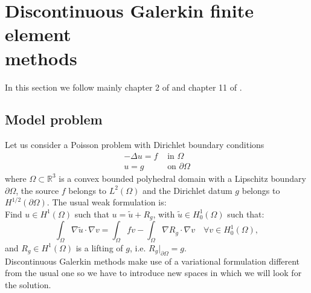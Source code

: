 \documentclass[12pt, a4paper]{article}
\theoremstyle{definition}
\theoremstyle{plain}
\theoremstyle{plain}
\theoremstyle{definition}
\begin{document}
\newpage
{}
\begin{spacing}{0.97}
\tableofcontents
\end{spacing}
\newpage


\section[Discontinuous Galerkin finite element methods]{Discontinuous Galerkin 
finite element\\methods}\label{sec:DG}
In this section we follow mainly chapter 2 of \cite{riviere} and chapter 11 of \cite{quart}.
\subsection{Model problem}
Let us consider a Poisson problem with Dirichlet boundary conditions
\begin{align} \label{eq:poisson}
	-\Delta u = f & \mbox{ in } \Omega\\
			u = g & \mbox{ on } \partial \Omega
\end{align}
where $\Omega \subset \mathbb{R}^3$ is a convex bounded polyhedral domain with 
a Lipschitz boundary $\partial \Omega$, the source $f$ belongs to $L^2(\Omega)$ 
and the Dirichlet datum $g$ belongs to $H^{1/2}(\partial \Omega)$.
The usual weak formulation is:\\
Find $u \in H^1(\Omega)$ such that $u = \tilde{u} + R_g$, with $\tilde{u} \in H^1_0(\Omega)$ such that:
\begin{equation} \label{eq:wform}
	\int_\Omega \nabla \tilde{u} \cdot \nabla v
	= \int_\Omega fv - \int_\Omega \nabla R_g \cdot \nabla v \quad \forall v 
	\in H^1_0(\Omega),
\end{equation}
and $R_g \in H^1(\Omega)$ is a lifting of $g$, i.e. $R_g|_{\partial \Omega} = g$.\\
Discontinuous Galerkin methods make use of a variational formulation different 
from the usual one so we have to introduce new spaces in which we will look for 
the solution.
\end{document}

